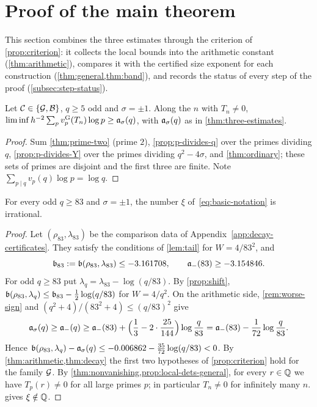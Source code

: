 \section{Proof of the main theorem}\label{sec:proofs}

This section combines the three estimates through the criterion of \cref{prop:criterion}: it
collects the local bounds into the arithmetic constant (\cref{thm:arithmetic}), compares it with
the certified size exponent for each construction (\cref{thm:general,thm:band}), and records the
status of every step of the proof (\cref{subsec:step-status}).

\begin{theorem}[arithmetic]\label{thm:arithmetic}
Let $\mathcal C\in\{\mathcal{G},\mathcal{B}\}$, $q\ge5$ odd and $\sigma=\pm1$. Along the $n$ with $T_n\ne0$,
$\liminf h^{-2}\sum_pv_{p}^{\mathrm{G}}(T_n)\log p\ge\mathfrak{a}_\sigma(q)$, with $\mathfrak{a}_\sigma(q)$ as in
\cref{thm:three-estimates}.
\end{theorem}

\begin{proof}
Sum \cref{thm:prime-two} (prime $2$), \cref{prop:p-divides-q} over the primes dividing $q$,
\cref{prop:p-divides-Y} over the primes dividing $q^2-4\sigma$, and \cref{thm:ordinary}; these sets
of primes are disjoint and the first three are finite. Note $\sum_{p\mid q}v_p(q)\log p=\log q$.
\end{proof}


\begin{theorem}\label{thm:general}
For every odd $q\ge83$ and $\sigma=\pm1$, the number $\xi$ of~\eqref{eq:basic-notation} is
irrational.
\end{theorem}

\begin{proof}
Let $(\rho_{83},\lambda_{83})$ be the comparison data of Appendix~\ref{app:decay-certificates}. They
satisfy the conditions of \cref{lem:tail} for $W=4/83^2$, and
\[
  \mathfrak{b}_{83}:=\mathfrak{b}(\rho_{83},\lambda_{83})\le-3.161708,\qquad
  \mathfrak{a}_-(83)\ge-3.154846 .
\]
For odd $q\ge83$ put $\lambda_q=\lambda_{83}-\log(q/83)$. By \cref{prop:shift},
$\mathfrak{b}(\rho_{83},\lambda_q)\le\mathfrak{b}_{83}-\frac12\log(q/83)$ for $W=4/q^2$. On the arithmetic
side, \cref{rem:worse-sign} and $(q^2+4)/(83^2+4)\le(q/83)^2$ give
\[
  \mathfrak{a}_\sigma(q)\ge\mathfrak{a}_-(q)\ge\mathfrak{a}_-(83)+\Bigl(\frac13-2\cdot\frac{25}{144}\Bigr)
  \log\frac q{83}=\mathfrak{a}_-(83)-\frac1{72}\log\frac q{83}.
\]
Hence $\mathfrak{b}(\rho_{83},\lambda_q)-\mathfrak{a}_\sigma(q)\le-0.006862-\frac{35}{72}\log(q/83)<0$. By
\cref{thm:arithmetic,thm:decay} the first two hypotheses of \cref{prop:criterion} hold for the
family $\mathcal{G}$. By \cref{thm:nonvanishing,prop:local-dets-general}, for every $r\in\mathbb{Q}$ we have
$T_p(r)\ne0$ for all large primes $p$; in particular $T_n\ne0$ for infinitely many $n$.
 gives $\xi\notin\mathbb{Q}$.
\end{proof}


